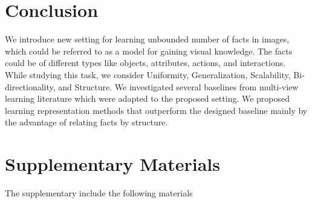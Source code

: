\documentclass[runningheads]{llncs}
\begin{document}
\section{Conclusion}

We introduce new setting  for learning unbounded number of facts in images, which could be referred to as a model for gaining visual knowledge. The facts could be of different types like objects, attributes, actions, and interactions.  While studying this task, we consider  Uniformity, Generalization, Scalability, Bi-directionality, and Structure. We investigated several baselines from multi-view learning literature which were adapted to the proposed setting. We proposed learning representation methods that outperform the designed baseline mainly by the advantage of relating facts by structure.  


\clearpage




\clearpage
\section*{Supplementary Materials}

The supplementary include the following materials

\end{document}
